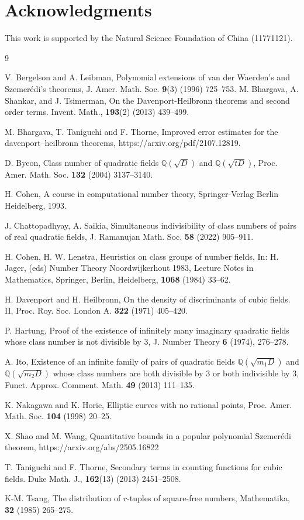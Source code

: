 \documentclass{amsart}
\begin{document}
\section*{Acknowledgments}

This work is supported by the Natural Science Foundation of China (11771121).
\begin{thebibliography}{9}



V. Bergelson and A. Leibman, Polynomial extensions of van der Waerden's and Szemerédi's theorems, J. Amer. Math. Soc.  {\bf9}(3) (1996) 725--753.
 M. Bhargava, A. Shankar, and J. Tsimerman, On the Davenport-Heilbronn theorems
and second order terms. Invent. Math., {\bf193}(2) (2013) 439--499.

 M. Bhargava, T. Taniguchi and F. Thorne, Improved error estimates for the davenport–heilbronn theorems, https://arxiv.org/pdf/2107.12819.

D. Byeon, Class number of quadratic fields $\mathbb{Q}(\sqrt{D})$ and $\mathbb{Q}(\sqrt{t D})$, Proc. Amer. Math. Soc. {\bf132} (2004)  3137--3140.



 H. Cohen,  A course in computational number theory, Springer-Verlag Berlin Heidelberg, 1993.


J. Chattopadhyay, A. Saikia, Simultaneous indivisibility of class numbers of pairs of real quadratic fields, J. Ramanujan Math. Soc. {\bf58} (2022)  905--911.

H. Cohen, H. W. Lenstra, Heuristics on class groups of number fields, In: H. Jager, (eds) Number Theory Noordwijkerhout 1983, Lecture Notes in Mathematics, Springer, Berlin, Heidelberg, {\bf1068} (1984)  33--62.

H. Davenport and H. Heilbronn, On the density of discriminants of cubic fields. II, Proc. Roy. Soc. London A. {\bf322} (1971) 405--420.


P. Hartung, Proof of the existence of infinitely many imaginary quadratic fields whose class
number is not divisible by 3, J. Number Theory {\bf6} (1974), 276--278.


A. Ito, Existence of an infinite family of pairs of quadratic fields $\mathbb{Q}\left(\sqrt{m_{1} D}\right)$ and $\mathbb{Q}\left(\sqrt{m_{2} D}\right)$ whose class numbers are both divisible by 3 or both indivisible by 3, Funct. Approx. Comment. Math. {\bf49} (2013)  111--135.

K. Nakagawa and K. Horie, Elliptic curves with no rational points, Proc. Amer. Math. Soc. {\bf104} (1998)  20--25.

X. Shao and M. Wang, Quantitative bounds in a popular polynomial Szemerédi theorem, https://arxiv.org/abs/2505.16822

T. Taniguchi and F. Thorne, Secondary terms in counting functions for cubic fields.
Duke Math. J., {\bf162}(13) (2013) 2451--2508.

 K-M. Tsang, The distribution of $r$-tuples of square-free numbers, Mathematika, {\bf32} (1985)  265--275.

\end{thebibliography}
\end{document}
